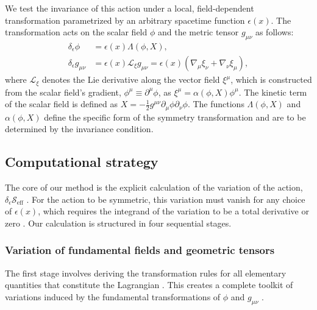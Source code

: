 \documentclass[twocolumn]{aastex631}
\begin{document}
We test the invariance of this action under a local, field-dependent transformation parametrized by an arbitrary spacetime function $\epsilon(x)$. The transformation acts on the scalar field $\phi$ and the metric tensor $g_{\mu\nu}$ as follows: \citep{jarv2015transformationpropertiesgeneralrelativity,babichev2024generalisationconformaldisformaltransformationsmetric}
\begin{align}
\delta_\epsilon \phi &= \epsilon(x) \Lambda(\phi, X), \\
\delta_\epsilon g_{\mu\nu} &= \epsilon(x) \mathcal{L}_{\xi} g_{\mu\nu} = \epsilon(x) (\nabla_\mu \xi_\nu + \nabla_\nu \xi_\mu), 
\end{align}
\citep{kupferman2023ellipticprecomplexeshodgelikedecompositions,popławski2024classicalphysicsspacetimefields}
where $\mathcal{L}_{\xi}$ denotes the Lie derivative along the vector field $\xi^\mu$, which is constructed from the scalar field's gradient, $\phi^\mu \equiv \partial^\mu\phi$, as $\xi^\mu = \alpha(\phi, X)\phi^\mu$. The kinetic term of the scalar field is defined as $X = -\frac{1}{2}g^{\mu\nu}\partial_\mu\phi\partial_\nu\phi$. The functions $\Lambda(\phi, X)$ and $\alpha(\phi, X)$ define the specific form of the symmetry transformation and are to be determined by the invariance condition.
\subsection{Computational strategy}
The core of our method is the explicit calculation of the variation of the action, $\delta_\epsilon \mathcal{S}_{\text{eff}}$  \citep{matsyuk2017inversevariationalproblemsymmetry,lyakhovich2025gaugesymmetrypartiallylagrangian}. For the action to be symmetric, this variation must vanish for any choice of $\epsilon(x)$, which requires the integrand of the variation to be a total derivative or zero  \citep{lyakhovich2025gaugesymmetrypartiallylagrangian}. Our calculation is structured in four sequential stages.
\subsubsection{Variation of fundamental fields and geometric tensors}
The first stage involves deriving the transformation rules for all elementary quantities that constitute the Lagrangian \citep{delcastillo2017symmetriesequationsmotionshared,koay2025generatingparticlephysicslagrangians}. This creates a complete toolkit of variations induced by the fundamental transformations of $\phi$ and $g_{\mu\nu}$ \citep{wagner2021demystifyinglagrangiansspecialrelativity}.
\end{document}
